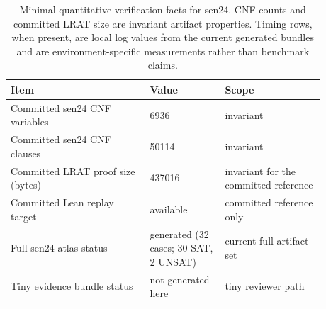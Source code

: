 \begin{table}[t]
\centering
\small
\begin{tabular}{p{0.39\linewidth} p{0.21\linewidth} p{0.28\linewidth}}
\toprule
Item & Value & Scope \\
\midrule
Committed sen24 CNF variables & 6936 & invariant \\
Committed sen24 CNF clauses & 50114 & invariant \\
Committed LRAT proof size (bytes) & 437016 & invariant for the committed reference \\
Committed Lean replay target & available & committed reference only \\
Full sen24 atlas status & generated (32 cases; 30 SAT, 2 UNSAT) & current full artifact set \\
Tiny evidence bundle status & not generated here & tiny reviewer path \\
\bottomrule
\end{tabular}
\caption{Minimal quantitative verification facts for sen24. CNF counts and committed LRAT size are invariant artifact properties. Timing rows, when present, are local log values from the current generated bundles and are environment-specific measurements rather than benchmark claims.}
\label{tab:sen24-verification-stats}
\end{table}
